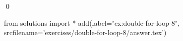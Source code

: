 
    \begin{ex}
  \label{ex:double-for-loop-8}
  
  \qed
\end{ex}
\begin{python0}
from solutions import *
add(label="ex:double-for-loop-8",
    srcfilename='exercises/double-for-loop-8/answer.tex') 
\end{python0}                              
